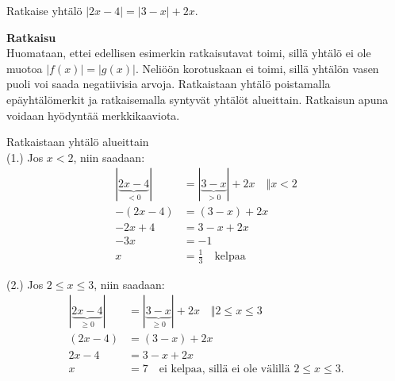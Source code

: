 \begin{esimerkki}
	Ratkaise yhtälö $|2x-4|=|3-x|+2x$.
	
	\textbf{Ratkaisu} \\
	Huomataan, ettei edellisen esimerkin ratkaisutavat toimi, sillä yhtälö ei ole muotoa $|f(x)|=|g(x)|$. Neliöön korotuskaan ei toimi, sillä yhtälön vasen puoli voi saada negatiivisia arvoja. Ratkaistaan yhtälö poistamalla epäyhtälömerkit ja ratkaisemalla syntyvät yhtälöt alueittain. Ratkaisun apuna voidaan hyödyntää merkkikaaviota.\\
	
	
\begin{lukusuora}{0}{4}{4}
\end{lukusuora}
\begin{lukusuora}{1}{5}{4}
\end{lukusuora}

\begin{center}
\begin{merkkikaavio}{2}

	\merkkikaavioMerkki{$-$}
	\merkkikaavioMerkki{$+$}
	\merkkikaavioMerkki{$+$}

\merkkikaavioUusirivi
	\merkkikaavioMerkki{$+$}
	\merkkikaavioMerkki{$+$}
	\merkkikaavioMerkki{$-$}

\end{merkkikaavio}
\end{center}

Ratkaistaan yhtälö alueittain\\
(1.) \quad Jos $x<2$, niin saadaan:
\begin{align*}
	|\underbrace{2x-4}_{<0}|&=|\underbrace{3-x}_{>0}|+2x \quad \Vert x<2  \\
	-(2x-4)&=(3-x)+2x \\
	-2x+4&=3-x+2x \\
	-3x &= -1 \\
	x &= \frac{1}{3} \quad \text{kelpaa}
\end{align*}

(2.) \quad Jos $2\leq x\leq 3$, niin saadaan:
\begin{align*}
	|\underbrace{2x-4}_{\geq0}|&=|\underbrace{3-x}_{\geq0}|+2x \quad \Vert 2\leq x\leq 3  \\
	(2x-4)&=(3-x)+2x \\
	2x-4&=3-x+2x \\
	x &= 7 \quad \text{ei kelpaa, sillä ei ole välillä $2\leq x\leq 3$.}
\end{align*}


\end{esimerkki}
